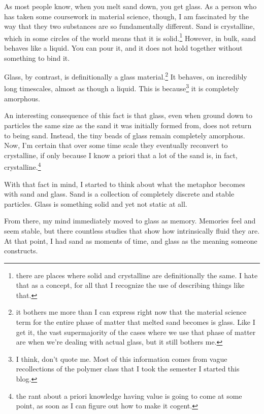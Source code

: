 \documentclass[12pt]{article}[titlepage]
\newcommand{\1}{\={a}}
\newcommand{\2}{\={e}}
\newcommand{\3}{\={\i}}
\newcommand{\4}{\=o}
\newcommand{\5}{\=u}
\newcommand{\6}{\={A}}
\renewcommand{\,}{\textsuperscript{,}}
\begin{document}
As most people know, when you melt sand down, you get glass.
As a person who has taken some coursework in material science, though, I am fascinated by the way that they two substances are so fundamentally different.
Sand is crystalline, which in some circles of the world means that it is solid.\footnote{there are places where solid and crystalline are definitionally the same. I hate that as a concept, for all that I recognize the use of describing things like that.}
However, in bulk, sand behaves like a liquid.
You can pour it, and it does not hold together without something to bind it.

Glass, by contrast, is definitionally a glass material.\footnote{it bothers me more than I can express right now that the material science term for the entire phase of matter that melted sand becomes is glass.
Like I get it, the vast supermajority of the cases where we use that phase of matter are when we're dealing with actual glass, but it still bothers me.}
It behaves, on incredibly long timescales, almost as though a liquid.
This is because\footnote{I think, don't quote me.
Most of this information comes from vague recollections of the polymer class that I took the semester I started this blog.}
it is completely amorphous.

An interesting consequence of this fact is that glass, even when ground down to particles the same size as the sand it was initially formed from, does not return to being sand.
Instead, the tiny beads of glass remain completely amorphous.
Now, I'm certain that over some time scale they eventually reconvert to crystalline, if only because I know a priori that a lot of the sand is, in fact, crystalline.\footnote{the rant about a priori knowledge having value is going to come at some point, as soon as I can figure out how to make it cogent.}

With that fact in mind, I started to think about what the metaphor becomes with sand and glass.
Sand is a collection of completely discrete and stable particles.
Glass is something solid and yet not static at all.

From there, my mind immediately moved to glass as memory.
Memories feel and seem stable, but there countless studies that show how intrinsically fluid they are.
At that point, I had sand as moments of time, and glass as the meaning someone constructs.
\end{document}
